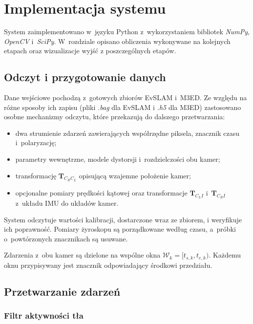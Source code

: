 \chapter{Implementacja systemu}
\label{cha:implementacja}

System zaimplementowano w~języku Python z~wykorzystaniem bibliotek \textit{NumPy}, \textit{OpenCV} i~\textit{SciPy}. W~rozdziale opisano obliczenia wykonywane na kolejnych etapach oraz wizualizacje wyjść z poszczególnych etapów.

\section{Odczyt i przygotowanie danych}
\label{sec:implementacja_wejscie}

Dane wejściowe pochodzą z~gotowych zbiorów EvSLAM i~M3ED. Ze względu na różne sposoby ich zapisu (pliki \textit{.bag} dla EvSLAM i \textit{.h5} dla M3ED) zastosowano osobne mechanizmy odczytu, które przekazują do dalszego przetwarzania:

\begin{itemize}
    \item dwa strumienie zdarzeń zawierających współrzędne piksela, znacznik czasu i~polaryzację;
    \item parametry wewnętrzne, modele dystorsji i~rozdzielczości obu kamer;
    \item transformację $\mathbf{T}_{C_R C_L}$ opisującą wzajemne położenie kamer;
    \item opcjonalne pomiary prędkości kątowej oraz transformacje $\mathbf{T}_{C_L I}$ i~$\mathbf{T}_{C_R I}$ z~układu IMU do układów kamer.
\end{itemize}

System odczytuje wartości kalibracji, dostarczone wraz ze zbiorem, i weryfikuje ich poprawność. Pomiary żyroskopu są porządkowane według czasu, a~próbki o~powtórzonych znacznikach są usuwane.

Zdarzenia z~obu kamer są dzielone na wspólne okna $\mathcal{W}_k=[t_{s,k},t_{e,k})$. Każdemu oknu przypisywany jest znacznik odpowiadający środkowi przedziału.

\section{Przetwarzanie zdarzeń}
\label{sec:implementacja_zdarzenia}

\subsection{Filtr aktywności tła}
\label{subsec:okna_baf}

